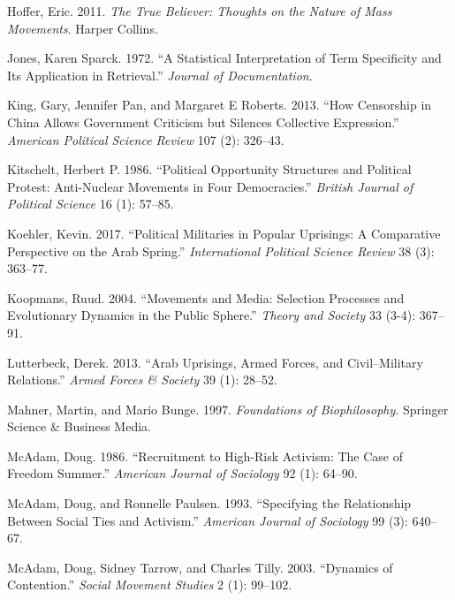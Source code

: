 \documentclass[
  english,
  man]{apa6}
\begin{document}
\leavevmode\hypertarget{ref-Hoffer2011true}{}%
Hoffer, Eric. 2011. \emph{The True Believer: Thoughts on the Nature of Mass Movements}. Harper Collins.

\leavevmode\hypertarget{ref-jones1972statistical}{}%
Jones, Karen Sparck. 1972. ``A Statistical Interpretation of Term Specificity and Its Application in Retrieval.'' \emph{Journal of Documentation}.

\leavevmode\hypertarget{ref-king2013censorship}{}%
King, Gary, Jennifer Pan, and Margaret E Roberts. 2013. ``How Censorship in China Allows Government Criticism but Silences Collective Expression.'' \emph{American Political Science Review} 107 (2): 326--43.

\leavevmode\hypertarget{ref-kitschelt1986political}{}%
Kitschelt, Herbert P. 1986. ``Political Opportunity Structures and Political Protest: Anti-Nuclear Movements in Four Democracies.'' \emph{British Journal of Political Science} 16 (1): 57--85.

\leavevmode\hypertarget{ref-koehler2017political}{}%
Koehler, Kevin. 2017. ``Political Militaries in Popular Uprisings: A Comparative Perspective on the Arab Spring.'' \emph{International Political Science Review} 38 (3): 363--77.

\leavevmode\hypertarget{ref-koopmans2004movements}{}%
Koopmans, Ruud. 2004. ``Movements and Media: Selection Processes and Evolutionary Dynamics in the Public Sphere.'' \emph{Theory and Society} 33 (3-4): 367--91.

\leavevmode\hypertarget{ref-lutterbeck2013arab}{}%
Lutterbeck, Derek. 2013. ``Arab Uprisings, Armed Forces, and Civil--Military Relations.'' \emph{Armed Forces \& Society} 39 (1): 28--52.

\leavevmode\hypertarget{ref-mahner1997foundations}{}%
Mahner, Martin, and Mario Bunge. 1997. \emph{Foundations of Biophilosophy}. Springer Science \& Business Media.

\leavevmode\hypertarget{ref-mcadam1986recruitment}{}%
McAdam, Doug. 1986. ``Recruitment to High-Risk Activism: The Case of Freedom Summer.'' \emph{American Journal of Sociology} 92 (1): 64--90.

\leavevmode\hypertarget{ref-mcadam1993specifying}{}%
McAdam, Doug, and Ronnelle Paulsen. 1993. ``Specifying the Relationship Between Social Ties and Activism.'' \emph{American Journal of Sociology} 99 (3): 640--67.

\leavevmode\hypertarget{ref-mcadam2003dynamics}{}%
McAdam, Doug, Sidney Tarrow, and Charles Tilly. 2003. ``Dynamics of Contention.'' \emph{Social Movement Studies} 2 (1): 99--102.
\end{document}
